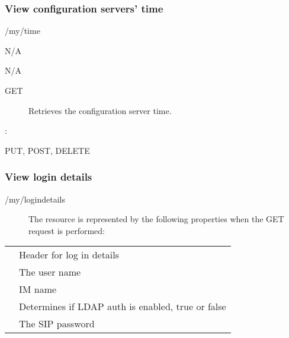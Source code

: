 \documentclass[letterpaper,10pt,english]{sphinxmanual}
\begin{document}
\subsubsection{View configuration servers’ time}
\label{\detokenize{restapi:view-configuration-servers-time}}
 /my/time

 N/A

 N/A
\begin{description}
\item[{ GET}] \leavevmode
Retrieves the configuration server time.

\end{description}

:

\begin{sphinxVerbatim}[commandchars=\\\{\}]
\end{sphinxVerbatim}

 PUT, POST, DELETE


\subsubsection{View login details}
\label{\detokenize{restapi:view-login-details}}
 /my/logindetails
\begin{description}
\item[{}] \leavevmode
The resource is represented by the following properties when the GET request is performed:

\end{description}


\begin{savenotes}\sphinxattablestart
\centering
\begin{tabulary}{\linewidth}[t]{|T|T|}
\hline

&
\\
\hline
{}
&
Header for log in details
\\
\hline
{}
&
The user name
\\
\hline
{}
&
IM name
\\
\hline
{}
&
Determines if LDAP auth is enabled, true or false
\\
\hline
{}
&
The SIP password
\\
\hline
\end{tabulary}
\par
\sphinxattableend\end{savenotes}
\end{document}
